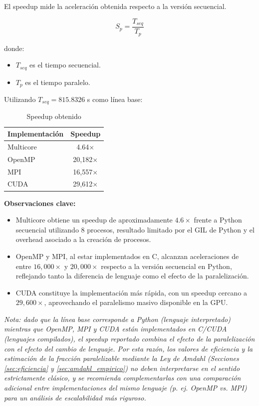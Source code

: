 El speedup mide la aceleración obtenida respecto a la versión secuencial.

\begin{equation}
S_p=
\frac{T_{seq}}
     {T_p}
\end{equation}

donde:

\begin{itemize}
    \item $T_{seq}$ es el tiempo secuencial.
    \item $T_p$ es el tiempo paralelo.
\end{itemize}

Utilizando $T_{seq} = 815.8326$ s como línea base:

\begin{table}[H]
\centering
\caption{Speedup obtenido}
\begin{tabular}{lc}
\toprule
Implementación & Speedup \\
\midrule
Multicore & 4.64$\times$ \\
OpenMP    & 20{,}182$\times$ \\
MPI       & 16{,}557$\times$ \\
CUDA      & 29{,}612$\times$ \\
\bottomrule
\end{tabular}
\end{table}

\textbf{Observaciones clave:}

\begin{itemize}
    \item Multicore obtiene un speedup de aproximadamente $4.6\times$ frente a Python secuencial utilizando 8 procesos, resultado limitado por el GIL de Python y el overhead asociado a la creación de procesos.
    \item OpenMP y MPI, al estar implementados en C, alcanzan aceleraciones de entre $16{,}000\times$ y $20{,}000\times$ respecto a la versión secuencial en Python, reflejando tanto la diferencia de lenguaje como el efecto de la paralelización.
    \item CUDA constituye la implementación más rápida, con un speedup cercano a $29{,}600\times$, aprovechando el paralelismo masivo disponible en la GPU.
\end{itemize}

\textit{Nota: dado que la línea base corresponde a Python (lenguaje interpretado) mientras que OpenMP, MPI y CUDA están implementados en C/CUDA (lenguajes compilados), el speedup reportado combina el efecto de la paralelización con el efecto del cambio de lenguaje. Por esta razón, los valores de eficiencia y la estimación de la fracción paralelizable mediante la Ley de Amdahl (Secciones \ref{sec:eficiencia} y \ref{sec:amdahl_empirico}) no deben interpretarse en el sentido estrictamente clásico, y se recomienda complementarlas con una comparación adicional entre implementaciones del mismo lenguaje (p. ej. OpenMP vs. MPI) para un análisis de escalabilidad más riguroso.}

